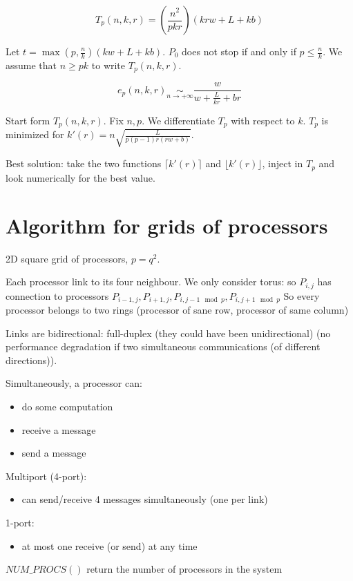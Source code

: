 \[T_p(n,k,r)=\left( \frac{n^2}{pkr}\right) (krw+L+kb)\]

Let $t=\max (p,\frac{n}{k})(kw+L+kb)$. $P_0$ does not stop if and only if $p\leq \frac{n}{k}$. We assume that $n\geq pk$ to write $T_p(n,k,r)$.

\[e_p(n,k,r) \underset{n\to +\infty}{\sim}\frac{w}{w+\frac{L}{kr}+br}\]

Start form $T_p(n,k,r)$. Fix $n,p$. We differentiate $T_p$ with respect to $k$. $T_p$ is minimized for $k'(r)=n\sqrt{\frac{L}{p(p-1)r(rw+b)}}$.

Best solution: take the two functions $\lceil k'(r)\rceil$ and $\lfloor k'(r)\rfloor$, inject in $T_p$ and look numerically for the best value.

\section{Algorithm for grids of processors}
2D square grid of processors, $p=q^2$.

Each processor link to its four neighbour. We only consider torus: so $P_{i,j}$ has connection to processors $P_{i-1,j},P_{i+1,j},P_{i,j-1 \mod p}, P_{i,j+1 \mod p}$
So every processor belongs to two rings (processor of sane row, processor of same column)

Links are bidirectional: full-duplex (they could have been unidirectional) (no performance degradation if two simultaneous communications (of different directions)).

Simultaneously, a processor can:
\begin{itemize}
\item do some computation
\item receive a message
\item send a message
\end{itemize}

Multiport (4-port):
\begin{itemize}
\item can send/receive 4 messages simultaneously (one per link)
\end{itemize}

1-port:
\begin{itemize}
\item at most one receive (or send) at any time
\end{itemize}

$NUM\_PROCS()$ return the number of processors in the system

